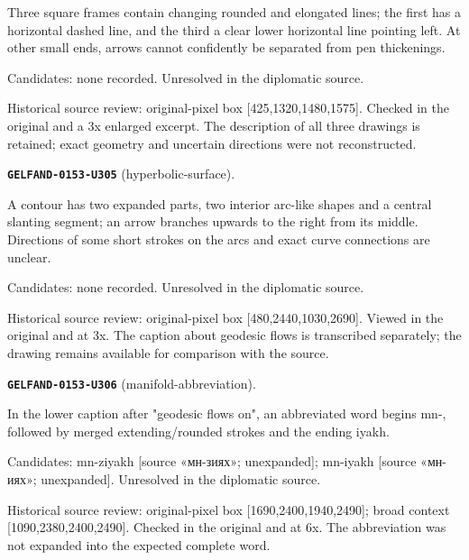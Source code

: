 Three square frames contain changing rounded and elongated lines; the first has a horizontal dashed line, and the third a clear lower horizontal line pointing left. At other small ends, arrows cannot confidently be separated from pen thickenings.\par
Candidates: none recorded. Unresolved in the diplomatic source.\par
Historical source review: original-pixel box [425,1320,1480,1575]. Checked in the original and a 3x enlarged excerpt. The description of all three drawings is retained; exact geometry and uncertain directions were not reconstructed.\par\medskip
\par\noindent\leavevmode{}\label{GELFAND-0153-U305}\textbf{\texttt{GELFAND-0153-U305}} (hyperbolic-surface).\nopagebreak[4]\par
A contour has two expanded parts, two interior arc-like shapes and a central slanting segment; an arrow branches upwards to the right from its middle. Directions of some short strokes on the arcs and exact curve connections are unclear.\par
Candidates: none recorded. Unresolved in the diplomatic source.\par
Historical source review: original-pixel box [480,2440,1030,2690]. Viewed in the original and at 3x. The caption about geodesic flows is transcribed separately; the drawing remains available for comparison with the source.\par\medskip
\par\noindent\leavevmode{}\label{GELFAND-0153-U306}\textbf{\texttt{GELFAND-0153-U306}} (manifold-abbreviation).\nopagebreak[4]\par
In the lower caption after "geodesic flows on", an abbreviated word begins mn-, followed by merged extending/rounded strokes and the ending iyakh.\par
Candidates: mn-ziyakh [source «мн-зиях»; unexpanded]; mn-iyakh [source «мн-иях»; unexpanded]. Unresolved in the diplomatic source.\par
Historical source review: original-pixel box [1690,2400,1940,2490]; broad context [1090,2380,2400,2490]. Checked in the original and at 6x. The abbreviation was not expanded into the expected complete word.\par\medskip

